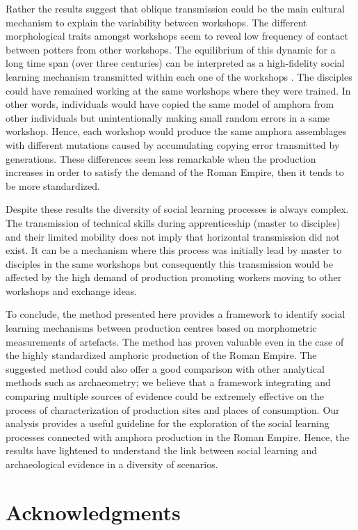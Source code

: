 \documentclass[review]{elsarticle}
\begin{document}
Rather the results suggest that oblique transmission could be the main cultural mechanism to explain the variability between workshops. The different morphological traits amongst workshops seem to reveal low frequency of contact between potters from other workshops. The equilibrium of this dynamic for a long time span (over three centuries) can be interpreted as a high-fidelity social learning mechanism transmitted within each one of the workshops \citep{schillinger_copying_2016}. The disciples could have remained working at the same workshops where they were trained. In other words, individuals would have copied the same model of amphora from other individuals but unintentionally making small random errors in a same workshop. Hence, each workshop would produce the same amphora assemblages with different mutations caused by accumulating copying error transmitted by generations. These differences seem less remarkable when the production increases in order to satisfy the demand of the Roman Empire, then it tends to be more standardized. 

Despite these results the diversity of social learning processes is always complex. The transmission of technical skills during apprenticeship (master to disciples) and their limited mobility does not imply that horizontal transmission did not exist. It can be a mechanism where this process was initially lead by master to disciples in the same workshops but consequently this transmission would be affected by the high demand of production promoting workers moving to other workshops and exchange ideas. 

To conclude, the method presented here provides a framework to identify social learning mechanisms between production centres based on morphometric measurements of artefacts. The method has proven valuable even in the case of the highly standardized amphoric production of the Roman Empire. The suggested method could also offer a good comparison with other analytical methods such as archaeometry; we believe that a framework integrating and comparing multiple sources of evidence could be extremely effective on the process of characterization of production sites and places of consumption. Our analysis provides a useful guideline for the exploration of the social learning processes connected with amphora production in the Roman Empire. Hence, the results have lightened to understand the link between social learning and archaeological evidence in a diversity of scenarios. 
 

\section{Acknowledgments}
\end{document}
